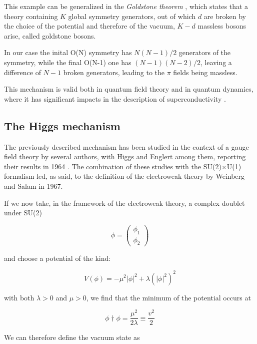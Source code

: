 This example can be generalized in the \emph{Goldstone theorem} \cite{1962PhRv..127..965G}, which states that a theory containing $K$ global symmetry generators, out of which $d$ are broken by the choice of the potential and therefore of the vacuum, $K - d$ massless bosons arise, called goldstone bosons. 

In our case the inital O(N) symmetry has $N(N-1)/2$ generators of the symmetry, while the final O(N-1) one has $(N-1)(N-2)/2$, leaving a difference of $N-1$ broken generators, leading to the $\pi$ fields being massless. 

This mechanism is valid both in quantum field theory and in quantum dynamics, where it has significant impacts in the description of superconductivity \cite{Nambu:1960tm}.

\subsection{The Higgs mechanism}

The previously described mechanism has been studied in the context of a gauge field theory by several authors, with Higgs and Englert among them, reporting their results in 1964 \cite{Englert:1964et, Higgs:1964ia}. The combination of these studies with the SU(2)$\times$U(1) formalism led, as said, to the definition of the electroweak theory by Weinberg and Salam in 1967.

If we now take, in the framework of the electroweak theory, a complex doublet under SU(2)

\begin{equation}
\phi = \left(\begin{array}{c}\phi_1 \\\phi_2\end{array}\right)
\end{equation}

and choose a potential of the kind:

\begin{equation}
V(\phi) = - \mu^2 |\phi|^2 + \lambda (|\phi|^2)^2
\end{equation}

with both $\lambda > 0$ and $\mu > 0$, we find that the minimum of the potential occurs at 

\begin{equation}
\phi\dag\phi = \dfrac{\mu^2}{2\lambda} \equiv \dfrac{v^2}{2}
\end{equation}

We can therefore define the vacuum state as

